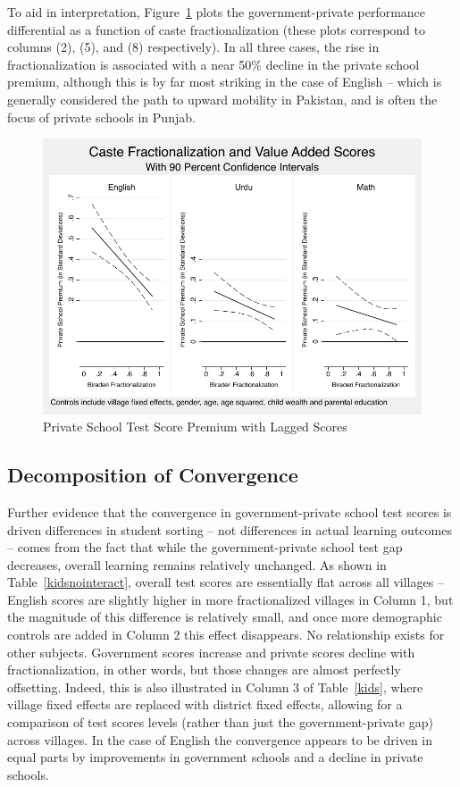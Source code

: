 \documentclass[Eubank_pk_ethnic_sorting.tex]{subfiles}
\begin{document}
To aid in interpretation, Figure~\ref{kidscombined} plots the government-private performance differential as a function of caste fractionalization (these plots correspond to columns (2), (5), and (8) respectively). In all three cases, the rise in fractionalization is associated with a near 50\% decline in the private school premium, although this is by far most striking in the case of English -- which is generally considered the path to upward mobility in Pakistan, and is often the focus of private schools in Punjab. 

\begin{figure}[h]
	\caption{Private School Test Score Premium with Lagged Scores}\label{kidscombined}
	\centering	
	\includegraphics[scale=0.8]{../graphs/kids_combined.pdf}
\end{figure}


\subsection{Decomposition of Convergence}\label{village_level_outcomes}

Further evidence that the convergence in government-private school test scores is driven differences in student sorting -- not differences in actual learning outcomes -- comes from the fact that while the government-private school test gap decreases, overall learning remains relatively unchanged. As shown in Table~\ref{kidsnointeract}, overall test scores are essentially flat across all villages -- English scores are slightly higher in more fractionalized villages in Column 1, but the magnitude of this difference is relatively small, and once more demographic controls are added in Column 2 this effect disappears. No relationship exists for other subjects. Government scores increase and private scores decline with fractionalization, in other words, but those changes are almost perfectly offsetting. Indeed, this is also illustrated in Column 3 of Table~\ref{kids}, where village fixed effects are replaced with district fixed effects, allowing for a comparison of test scores levels (rather than just the government-private gap) across villages. In the case of English the convergence appears to be driven in equal parts by improvements in government schools and a decline in private schools.
\end{document}
